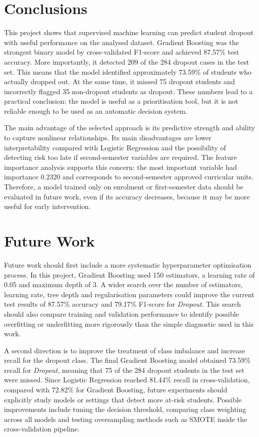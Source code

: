 \documentclass[conference]{IEEEtran}
\begin{document}
\section{Conclusions}
This project shows that supervised machine learning can predict student dropout with useful performance on the analysed dataset. Gradient Boosting was the strongest binary model by cross-validated F1-score and achieved 87.57\% test accuracy. More importantly, it detected 209 of the 284 dropout cases in the test set. This means that the model identified approximately 73.59\% of students who actually dropped out. At the same time, it missed 75 dropout students and incorrectly flagged 35 non-dropout students as dropout. These numbers lead to a practical conclusion: the model is useful as a prioritisation tool, but it is not reliable enough to be used as an automatic decision system.

The main advantage of the selected approach is its predictive strength and ability to capture nonlinear relationships. Its main disadvantages are lower interpretability compared with Logistic Regression and the possibility of detecting risk too late if second-semester variables are required. The feature importance analysis supports this concern: the most important variable had importance 0.2320 and corresponds to second-semester approved curricular units. Therefore, a model trained only on enrolment or first-semester data should be evaluated in future work, even if its accuracy decreases, because it may be more useful for early intervention.

\section{Future Work}
Future work should first include a more systematic hyperparameter optimisation process. In this project, Gradient Boosting used 150 estimators, a learning rate of 0.05 and maximum depth of 3. A wider search over the number of estimators, learning rate, tree depth and regularisation parameters could improve the current test results of 87.57\% accuracy and 79.17\% F1-score for \textit{Dropout}. This search should also compare training and validation performance to identify possible overfitting or underfitting more rigorously than the simple diagnostic used in this work.

A second direction is to improve the treatment of class imbalance and increase recall for the dropout class. The final Gradient Boosting model obtained 73.59\% recall for \textit{Dropout}, meaning that 75 of the 284 dropout students in the test set were missed. Since Logistic Regression reached 81.44\% recall in cross-validation, compared with 72.82\% for Gradient Boosting, future experiments should explicitly study models or settings that detect more at-risk students. Possible improvements include tuning the decision threshold, comparing class weighting across all models and testing oversampling methods such as SMOTE inside the cross-validation pipeline.
\end{document}
